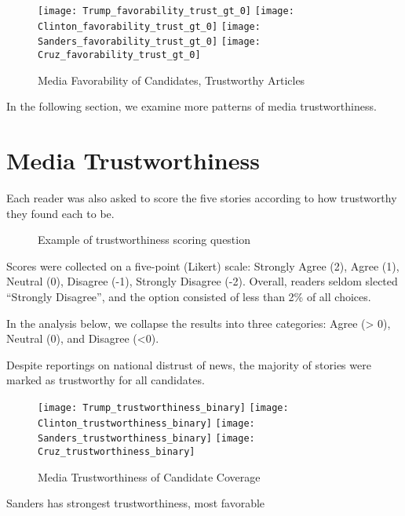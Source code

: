 \begin{figure}[h!] 
\centering
  \texttt{[image: Trump\_favorability\_trust\_gt\_0]} 
  \texttt{[image: Clinton\_favorability\_trust\_gt\_0]} 
  \texttt{[image: Sanders\_favorability\_trust\_gt\_0]} 
  \texttt{[image: Cruz\_favorability\_trust\_gt\_0]} 
  \caption{Media Favorability of Candidates, Trustworthy Articles}
\end{figure}

In the following section, we examine more patterns of media trustworthiness.


\section{Media Trustworthiness}

Each reader was also asked to score the five stories according to how trustworthy they found each to be. 

\begin{figure}[h!] 
\centering
  \caption{Example of trustworthiness scoring question}
\end{figure}

Scores were collected on a five-point (Likert) scale: Strongly Agree (2), Agree (1), Neutral (0), Disagree (-1), Strongly Disagree (-2). Overall, readers seldom slected ``Strongly Disagree'', and the option consisted of less than 2\% of all choices.

In the analysis below, we collapse the results into three categories: Agree (> 0), Neutral (0), and Disagree (<0).

Despite reportings on national distrust of news, the majority of stories were marked as trustworthy for all candidates.

\begin{figure}[h!] 
\centering
  \texttt{[image: Trump\_trustworthiness\_binary]} 
  \texttt{[image: Clinton\_trustworthiness\_binary]} 
  \texttt{[image: Sanders\_trustworthiness\_binary]} 
  \texttt{[image: Cruz\_trustworthiness\_binary]} 
  \caption{Media Trustworthiness of Candidate Coverage}
\end{figure}

 Sanders has strongest trustworthiness, most favorable



 

